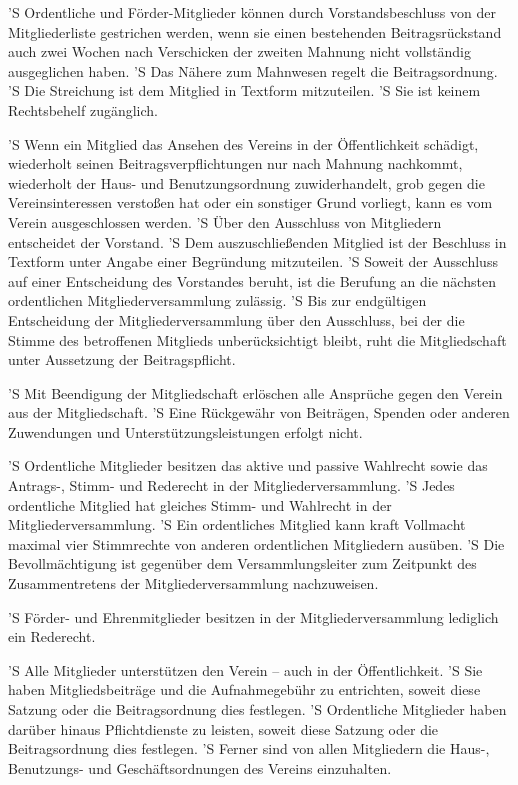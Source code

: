 \documentclass[a4paper,10pt]{scrreprt}
\begin{document}
\begin{contract}
'S Ordentliche und Förder-Mitglieder können durch Vorstandsbeschluss von der
Mitgliederliste gestrichen werden, wenn sie einen bestehenden Beitragsrückstand
auch zwei Wochen nach Verschicken der zweiten Mahnung nicht vollständig
ausgeglichen haben.
'S Das Nähere zum Mahnwesen regelt die Beitragsordnung.
'S Die Streichung ist dem Mitglied in Textform mitzuteilen.
'S Sie ist keinem Rechtsbehelf zugänglich.

'S Wenn ein Mitglied das Ansehen des Vereins in der Öffentlichkeit schädigt,
wiederholt seinen Beitragsverpflichtungen nur nach Mahnung nachkommt,
wiederholt der Haus- und Benutzungsordnung zuwiderhandelt, grob gegen die
Vereinsinteressen verstoßen hat oder ein sonstiger Grund vorliegt, kann es vom
Verein ausgeschlossen werden.
'S Über den Ausschluss von Mitgliedern entscheidet der Vorstand.
'S Dem auszuschließenden Mitglied ist der Beschluss in Textform unter Angabe
einer Begründung mitzuteilen.
'S Soweit der Ausschluss auf einer Entscheidung des Vorstandes beruht, ist die
Berufung an die nächsten ordentlichen Mitgliederversammlung zulässig.
'S Bis zur endgültigen Entscheidung der Mitgliederversammlung über den
Ausschluss, bei der die Stimme des betroffenen Mitglieds unberücksichtigt
bleibt, ruht die Mitgliedschaft unter Aussetzung der Beitragspflicht.

'S Mit Beendigung der Mitgliedschaft erlöschen alle Ansprüche gegen den Verein
aus der Mitgliedschaft.
'S Eine Rückgewähr von Beiträgen, Spenden oder anderen Zuwendungen und
Unterstützungsleistungen erfolgt nicht.


'S Ordentliche Mitglieder besitzen das aktive und passive Wahlrecht sowie das
Antrags-, Stimm- und Rederecht in der Mitgliederversammlung.
'S Jedes ordentliche Mitglied hat gleiches Stimm- und Wahlrecht in der
Mitgliederversammlung.
'S Ein ordentliches Mitglied kann kraft Vollmacht maximal vier Stimmrechte von
anderen ordentlichen Mitgliedern ausüben.
'S Die Bevollmächtigung ist gegenüber dem Versammlungsleiter zum Zeitpunkt des
Zusammentretens der Mitgliederversammlung nachzuweisen.

'S Förder- und Ehrenmitglieder besitzen in der Mitgliederversammlung lediglich
ein Rederecht.

'S Alle Mitglieder unterstützen den Verein – auch in der Öffentlichkeit.
'S Sie haben Mitgliedsbeiträge und die Aufnahmegebühr zu entrichten, soweit
diese Satzung oder die Beitragsordnung dies festlegen.
'S Ordentliche Mitglieder haben darüber hinaus Pflichtdienste zu leisten,
soweit diese Satzung oder die Beitragsordnung dies festlegen.
'S Ferner sind von allen Mitgliedern die Haus-, Benutzungs- und
Geschäftsordnungen des Vereins einzuhalten.


\end{contract}
\end{document}
